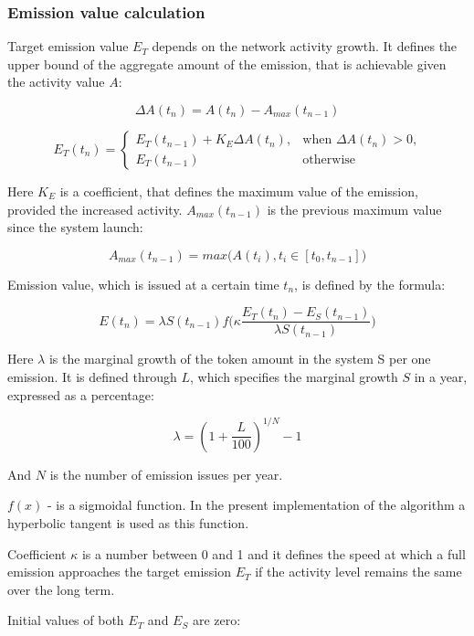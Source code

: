 \documentclass[a4paper,12pt]{article}
\begin{document}
\subsubsection{Emission value calculation}
\label{emissioncalc}
Target emission value $E_T$ depends on the network activity growth. It defines the upper bound of the aggregate amount of the emission, that is achievable given the activity value $A$:



$$
\Delta A(t_n) = A(t_n) - A_{max}(t_{n-1})
$$

$$
E_T(t_n) = \begin{cases}
 E_T(t_{n-1}) + K_E \Delta A(t_n),
 & \text{when $\Delta A(t_n) > 0$,}\\
 E_T(t_{n-1}) & \text{otherwise}
\end{cases}
$$

Here $K_E$ is a coefficient, that defines the maximum value of the emission, provided the increased activity. $A_{max}(t_{n-1})$ is the previous maximum value since the system launch:



$$
    A_{max}(t_{n-1}) = max \Big ( A(t_i), t_i \in [t_0, t_{n-1}] \Big )
$$

Emission value, which is issued at a certain time $t_n$, is defined by the formula:



$$
    E(t_n) = \lambda S(t_{n-1}) f \Big( \kappa \frac {E_T(t_n) - E_S(t_{n-1})}{\lambda S(t_{n-1})} \Big)
$$

Here $\lambda$ is the marginal growth of the token amount in the system S per one emission. It is defined through $L$, which specifies the marginal growth $S$ in a year, expressed as a percentage:



$$
    \lambda = (1 + \frac{L}{100})^{1/N}-1
$$

And $N$ is the number of emission issues per year.



$f(x)$ - is a sigmoidal function. In the present implementation of the algorithm a hyperbolic tangent is used as this function. 


Coefficient $\kappa$ is a number between 0 and 1 and it defines the speed at which a full emission approaches the target emission $E_T$ if the activity level remains the same over the long term.



Initial values of both $E_T$ and $E_S$ are zero:
\end{document}

